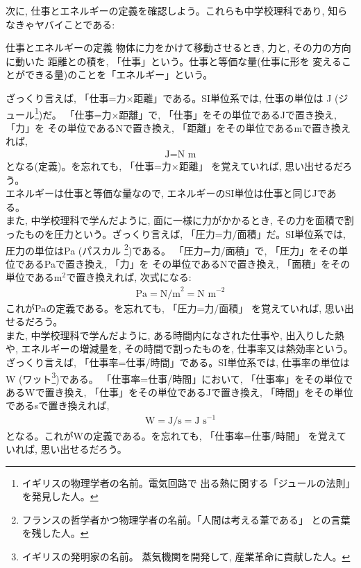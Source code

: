 次に, 仕事とエネルギーの定義を確認しよう。これらも中学校理科であり, 
知らなきゃヤバイことである:
\begin{itembox}{仕事とエネルギーの定義} 
物体に力をかけて移動させるとき, 力と, その力の方向に動いた
距離との積を, 「仕事」という。仕事と等価な量(仕事に形を
変えることができる量)のことを「エネルギー」という。
\end{itembox}

ざっくり言えば, 「仕事=力×距離」である。SI単位系では, 仕事の単位は
J (ジュール\footnote{イギリスの物理学者の名前。電気回路で
出る熱に関する「ジュールの法則」を発見した人。})だ。
「仕事=力×距離」で, 「仕事」をその単位であるJで置き換え, 「力」を
その単位であるNで置き換え, 「距離」をその単位であるmで置き換えれば, 
\begin{eqnarray}
\text{J}=\text{N m}\label{ed:def_J}
\end{eqnarray}
となる(定義)。を忘れても, 「仕事=力×距離」
を覚えていれば, 思い出せるだろう。\\

エネルギーは仕事と等価な量なので, エネルギーのSI単位は仕事と同じJである。\\

また, 中学校理科で学んだように, 面に一様に力がかかるとき, 
その力を面積で割ったものを圧力という。ざっくり言えば, 
「圧力=力/面積」だ。SI単位系では, 圧力の単位はPa (パスカル
\footnote{フランスの哲学者かつ物理学者の名前。「人間は考える葦である」
との言葉を残した人。})である。
「圧力=力/面積」で, 「圧力」をその単位であるPaで置き換え, 「力」を
その単位であるNで置き換え, 「面積」をその単位であるm$^2$で置き換えれば, 
次式になる:
\begin{eqnarray}
\text{Pa}=\text{N/m}^2=\text{N m}^{-2}\label{ed:def_Pa}
\end{eqnarray}
これがPaの定義である。を忘れても, 「圧力=力/面積」
を覚えていれば, 思い出せるだろう。\\

また, 中学校理科で学んだように, ある時間内になされた仕事や, 出入りした熱や, 
エネルギーの増減量を, その時間で割ったものを, 仕事率又は熱効率という。
ざっくり言えば, 「仕事率=仕事/時間」である。SI単位系では, 
仕事率の単位はW (ワット\footnote{イギリスの発明家の名前。
蒸気機関を開発して, 産業革命に貢献した人。})である。
「仕事率=仕事/時間」において, 「仕事率」をその単位であるWで置き換え, 
「仕事」をその単位であるJで置き換え, 「時間」をその単位であるsで置き換えれば, 
\begin{eqnarray}
\text{W}=\text{J/s}=\text{J s}^{-1}\label{ed:def_W}
\end{eqnarray}
となる。これがWの定義である。を忘れても, 「仕事率=仕事/時間」
を覚えていれば, 思い出せるだろう。

